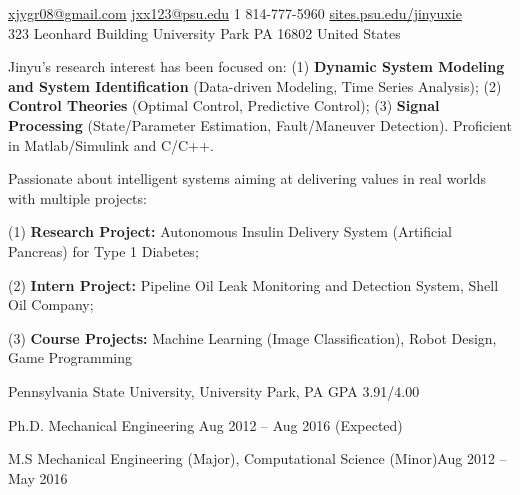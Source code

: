 \documentclass[10pt,a4paper]{article}
\begin{document}
\sloppy  %



\nobreakvspace{0.3em}  %

\noindent\href{mailto:xjygr08@gmail.com}{xjygr08@gmail.com}\sbull
\href{mailto:jxx123@psu.edu}{jxx123@psu.edu}\sbull
\textsmaller{+}1 814-777-5960\sbull
\href{http://sites.psu.edu/jinyuxie/}{sites.psu.edu/jinyuxie}
\\
323 Leonhard Building\sbull
University Park\sbull
PA 16802\sbull
United States

\spacedhrule{0.5em}{-0.8em}  %

Jinyu's research interest has been focused on: (1) \textbf{Dynamic System Modeling and System
Identification} (Data-driven Modeling, Time Series Analysis); (2) \textbf{Control
Theories} (Optimal Control, Predictive Control); (3) \textbf{Signal Processing}
(State/Parameter Estimation, Fault/Maneuver Detection). Proficient in
Matlab/Simulink and C/C++. \vspace{-0.7em} 

\noindent Passionate about intelligent systems aiming at delivering values in
real worlds with multiple projects:

(1) \textbf{Research Project:} Autonomous Insulin Delivery System (Artificial Pancreas) for Type
1 Diabetes;

(2) \textbf{Intern Project:} Pipeline Oil Leak Monitoring and Detection System, Shell Oil Company;

(3) \textbf{Course Projects:} Machine Learning (Image Classification), Robot
Design, Game Programming



\spacedhrule{0.5em}{-0.8em}


\headedsection
{Pennsylvania State University, University Park, PA}
{GPA 3.91/4.00}{
  \headedsubsection
  {Ph.D. Mechanical Engineering}
  {Aug 2012 -- Aug 2016 (Expected)}{}

  \headedsubsection
  {M.S Mechanical Engineering (Major), Computational Science (Minor)}{Aug 2012
    -- May 2016}{}
}
\end{document}
